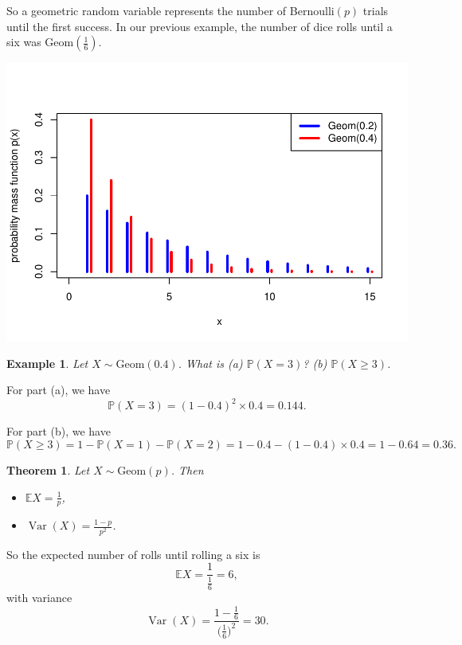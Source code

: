 \documentclass[
  a4paper,
]{book}
\providecommand{\tightlist}{%
  \setlength{\itemsep}{0pt}\setlength{\parskip}{0pt}}
\newtheorem{theorem}{Theorem}[chapter]
\theoremstyle{definition}
\theoremstyle{definition}
\newtheorem{example}{Example}[chapter]
\theoremstyle{definition}
\theoremstyle{definition}
\theoremstyle{remark}
\begin{document}
So a geometric random variable represents the number of Bernoulli\((p)\) trials until the first success. In our previous example, the number of dice rolls until a six was \(\text{Geom}(\frac16)\).

\includegraphics{math1710_files/figure-latex/geom-pic-1.pdf}

\begin{example}
\emph{Let \(X \sim \mathrm{Geom}(0.4)\). What is (a) \(\mathbb P(X = 3)\)? (b) \(\mathbb P(X \geq 3)\).}

For part (a), we have
\[ \mathbb P(X = 3) = (1 - 0.4)^2 \times 0.4 = 0.144 . \]

For part (b), we have
\[ \mathbb P(X \geq 3) = 1 - \mathbb P(X =1) - \mathbb P(X = 2) = 1 - 0.4 - (1-0.4)\times 0.4 = 1- 0.64 = 0.36 . \]
\end{example}

\begin{theorem}

Let \(X \sim \text{Geom}(p)\). Then

\begin{itemize}
\tightlist
\item
  \(\mathbb EX = \displaystyle\frac1p\),
\item
  \(\operatorname{Var}(X) = \displaystyle\frac{1-p}{p^2}\).
\end{itemize}

\end{theorem}

So the expected number of rolls until rolling a six is
\[ \mathbb EX = \frac{1}{\frac16} = 6 , \]
with variance
\[ \operatorname{Var}(X) = \frac{1 - \frac16}{\big(\frac16\big)^2} = 30 . \]
\end{document}
